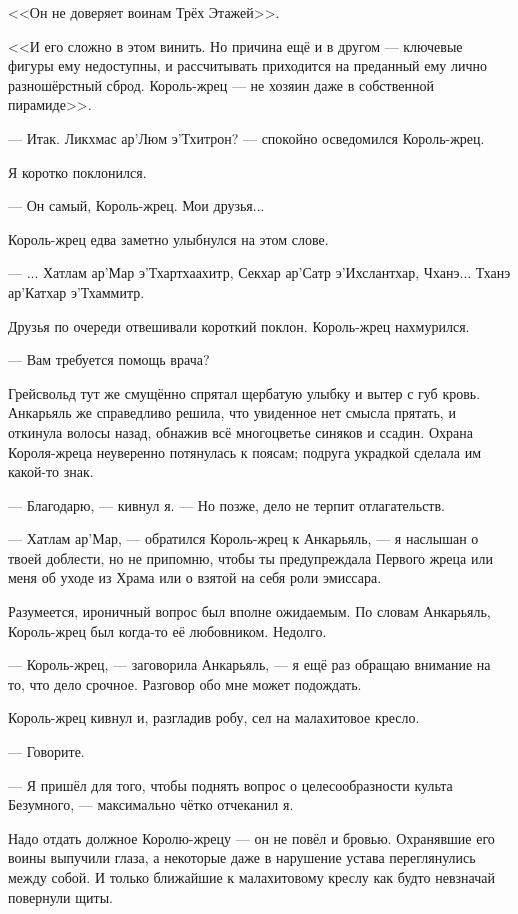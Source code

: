 <<Он не доверяет воинам Трёх Этажей>>.

<<И его сложно в этом винить.
Но причина ещё и в другом --- ключевые фигуры ему недоступны, и рассчитывать приходится на преданный ему лично разношёрстный сброд.
Король-жрец --- не хозяин даже в собственной пирамиде>>.

--- Итак.
Ликхмас ар’Люм э’Тхитрон? --- спокойно осведомился Король-жрец.

Я коротко поклонился.

--- Он самый, Король-жрец.
Мои друзья...

Король-жрец едва заметно улыбнулся на этом слове.

---  ... Хатлам ар’Мар э’Тхартхаахитр, Секхар ар’Сатр э’Ихслантхар, Чханэ... Тханэ ар’Катхар э’Тхаммитр.

Друзья по очереди отвешивали короткий поклон.
Король-жрец нахмурился.

--- Вам требуется помощь врача?

Грейсвольд тут же смущённо спрятал щербатую улыбку и вытер с губ кровь.
Анкарьяль же справедливо решила, что увиденное нет смысла прятать, и откинула волосы назад, обнажив всё многоцветье синяков и ссадин.
Охрана Короля-жреца неуверенно потянулась к поясам;
подруга украдкой сделала им какой-то знак.

--- Благодарю, --- кивнул я.
--- Но позже, дело не терпит отлагательств.

--- Хатлам ар’Мар, --- обратился Король-жрец к Анкарьяль, --- я наслышан о твоей доблести, но не припомню, чтобы ты предупреждала Первого жреца или меня об уходе из Храма или о взятой на себя роли эмиссара.

Разумеется, ироничный вопрос был вполне ожидаемым.
По словам Анкарьяль, Король-жрец был когда-то её любовником.
Недолго.

--- Король-жрец, --- заговорила Анкарьяль, --- я ещё раз обращаю внимание на то, что дело срочное.
Разговор обо мне может подождать.

Король-жрец кивнул и, разгладив робу, сел на малахитовое кресло.

--- Говорите.

--- Я пришёл для того, чтобы поднять вопрос о целесообразности культа Безумного, --- максимально чётко отчеканил я.

Надо отдать должное Королю-жрецу --- он не повёл и бровью.
Охранявшие его воины выпучили глаза, а некоторые даже в нарушение устава переглянулись между собой.
И только ближайшие к малахитовому креслу как будто невзначай повернули щиты.

